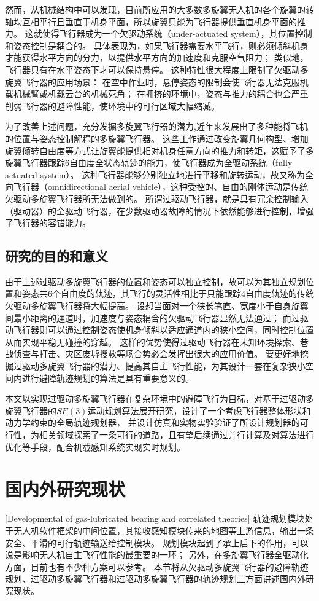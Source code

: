 然而，从机械结构中可以发现，目前所应用的大多数多旋翼无人机的各个旋翼的转轴均互相平行且垂直于机身平面，所以旋翼只能为飞行器提供垂直机身平面的推力。
这就使得飞行器成为一个欠驱动系统（under-actuated system）\cite{underactuated}，其位置控制和姿态控制是耦合的。
具体表现为，如果飞行器需要水平飞行，则必须倾斜机身才能获得水平方向的分力，以提供水平方向的加速度和克服空气阻力；
类似地，飞行器只有在水平姿态下才可以保持悬停。
这种特性很大程度上限制了欠驱动多旋翼飞行器的应用场景：
在空中作业时，悬停姿态的限制会使飞行器无法克服机载机械臂或机载云台的机械死角；
在拥挤的环境中，姿态与推力的耦合也会严重削弱飞行器的避障性能，使环境中的可行区域大幅缩减。

为了改善上述问题，充分发掘多旋翼飞行器的潜力,近年来发展出了多种能将飞机的位置与姿态控制解耦的多旋翼飞行器。
这些工作通过改变旋翼几何构型、增加旋翼倾转自由度等方式让旋翼能提供相对机身任意方向的推力和转矩，这赋予了多旋翼飞行器跟踪6自由度全状态轨迹的能力，使飞行器成为全驱动系统（fully actuated system）。
这种飞行器能够分别独立地进行平移和旋转运动，故又称为全向飞行器（omnidirectional aerial vehicle），这种受控的、自由的刚体运动是传统欠驱动多旋翼飞行器所无法做到的。
所谓过驱动飞行器，就是具有冗余控制输入（驱动器）的全驱动飞行器，在少数驱动器故障的情况下依然能够进行控制，增强了飞行器的容错能力。


\subsection{研究的目的和意义}
由于上述过驱动多旋翼飞行器的位置和姿态可以独立控制，故可以为其独立规划位置和姿态共6个自由度的轨迹，其飞行的灵活性相比于只能跟踪4自由度轨迹的传统欠驱动多旋翼飞行器将大幅提高。
设想当面对一个狭长笔直、宽度小于自身旋翼间最小距离的通道时，加速度与姿态耦合的欠驱动飞行器显然无法通过；
而过驱动飞行器则可以通过控制姿态使机身倾斜以适应通道内的狭小空间，同时控制位置从而实现平稳无碰撞的穿越。
这样的优势使得过驱动飞行器在未知环境探索、巷战侦查与打击、灾区废墟搜救等场合势必会发挥出很大的应用价值。
要更好地挖掘过驱动多旋翼飞行器的潜力、提高其自主飞行性能，为其设计一套在复杂狭小空间内进行避障轨迹规划的算法是具有重要意义的。

本文以实现过驱动多旋翼飞行器在复杂环境中的避障飞行为目标，对基于过驱动多旋翼飞行器的$SE(3)$运动规划算法展开研究，设计了一个考虑飞行器整体形状和动力学约束的全局轨迹规划器，
并设计仿真和实物实验验证了所设计规划器的可行性，为相关领域探索了一条可行的道路，且有望后续通过并行计算及对算法进行优化等手段，配合机载感知系统实现实时规划。


\section{国内外研究现状}[Developmental of gas-lubricated bearing and correlated theories]
轨迹规划模块处于无人机软件框架的中间位置，其接收感知模块传来的地图等上游信息，输出一条安全、平滑的可行轨迹输送给控制模块。
规划模块起到了承上启下的作用，可以说是影响无人机自主飞行性能的最重要的一环；
另外，在多旋翼飞行器全驱动化方面，目前也有不少种方案可以参考。
本节将从欠驱动多旋翼飞行器的避障轨迹规划、过驱动多旋翼飞行器和过驱动多旋翼飞行器的轨迹规划三方面讲述国内外研究现状。

